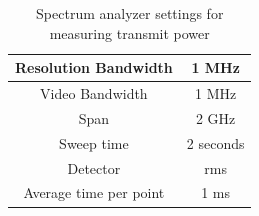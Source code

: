 \documentclass[journal,comsoc]{IEEEtran}
\begin{document}
\begin{table}[h!]
	\centering
	\begin{tabular}{|c|c|}
		\hline
		Resolution Bandwidth & 1 MHz \\ \hline
		Video Bandwidth & 1 MHz \\ \hline
		Span & 2 GHz \\ \hline
		Sweep time & 2 seconds \\ \hline
		Detector & rms \\ \hline
		Average time per point & 1 ms \\ \hline
	\end{tabular}
	\caption{Spectrum analyzer settings for measuring transmit power}
	\label{tab:sasettings}
\end{table}

\vspace*{1em}
\end{document}
